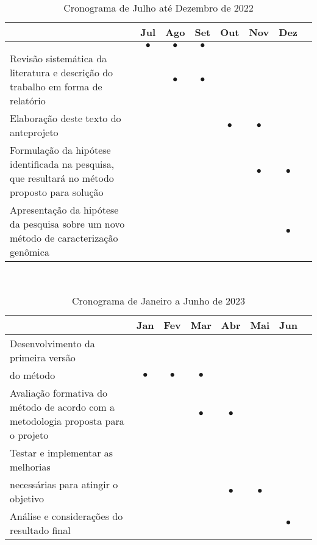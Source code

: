 \begin{table}[hb]
    \centering
    \begin{tabular}{ p{7.8cm} c c c c c c c }
        \toprule
         & Jul       & Ago       & Set       & Out       & Nov       & Dez       & \\
        \midrule
         & $\bullet$ & $\bullet$ & $\bullet$ &           &           &           & \\
        \midrule
        Revisão sistemática da literatura e descrição do trabalho em forma de relatório
         &           & $\bullet$ & $\bullet$ &           &           &           & \\
        \midrule
        Elaboração deste texto do anteprojeto
         &           &           &           & $\bullet$ & $\bullet$ &           & \\
        \midrule
        Formulação da hipótese identificada na pesquisa, que resultará no método proposto para solução
         &           &           &           &           & $\bullet$ & $\bullet$ & \\
        \midrule
        Apresentação da hipótese da pesquisa sobre um novo método de caracterização genômica
         &           &           &           &           &           & $\bullet$ & \\

        \bottomrule
    \end{tabular}
    \caption{Cronograma de Julho até Dezembro de 2022}~\label{tab:cronograma_tcc_i}
\end{table}

\begin{table}[ht]
    \centering
    \begin{tabular}{ p{7.8cm} c c c c c c c }
        \toprule
         & Jan       & Fev       & Mar       & Abr       & Mai       & Jun       & \\
        \midrule
        Desenvolvimento da primeira versão\\ do método
         & $\bullet$ & $\bullet$ & $\bullet$ &           &           &           & \\
        \midrule
        Avaliação formativa do método de acordo com a metodologia proposta para o projeto
         &           &           & $\bullet$ & $\bullet$ &           &           & \\
        \midrule
        Testar e implementar as melhorias\\ necessárias para atingir o objetivo
         &           &           &           & $\bullet$ & $\bullet$ &           & \\
        \midrule
        Análise e considerações do resultado final
         &           &           &           &           &           & $\bullet$ & \\
        \midrule
        \bottomrule
    \end{tabular}
    \caption{Cronograma de Janeiro a Junho de 2023}~\label{tab:cronograma_tcc_ii}
\end{table}

